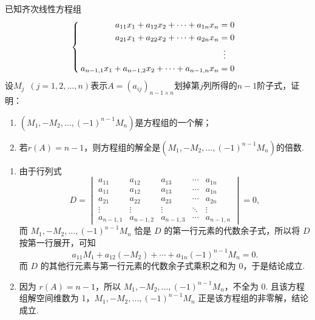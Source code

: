 \begin{exercise}
\begin{exgroup}
        \item 已知齐次线性方程组
        \[\begin{cases} \begin{aligned}
                    a_{11}x_1+a_{12}x_2+\cdots+a_{1n}x_n          & = 0             \\
                    a_{21}x_1+a_{22}x_2+\cdots+a_{2n}x_n          & = 0             \\
                                                                  & \vdotswithin{=} \\
                    a_{n-1,1}x_1+a_{n-1,2}x_2+\cdots+a_{n-1,n}x_n & = 0
                \end{aligned} \end{cases}\]
        设$M_j\enspace(j=1,2,\ldots,n)$表示$A=(a_{ij})_{n-1 \times n}$划掉第$j$列所得的$n-1$阶子式，证明：
        \begin{enumerate}
            \item $(M_1,-M_2,\ldots,(-1)^{n-1}M_n)$是方程组的一个解；

            \item 若$r(A)=n-1$，则方程组的解全是$(M_1,-M_2,\ldots,(-1)^{n-1}M_n)$的倍数.
        \end{enumerate}
        \begin{answer}
            \begin{enumerate}
                \item 由于行列式
                      \[ D = \begin{vmatrix}
                              a_{11}     & a_{12}     & a_{13}     & \cdots & a_{1n}     \\
                              a_{11}     & a_{12}     & a_{13}     & \cdots & a_{1n}     \\
                              a_{21}     & a_{22}     & a_{23}     & \cdots & a_{2n}     \\
                              \vdots     & \vdots     & \vdots     & \ddots & \vdots     \\
                              a_{n-1, 1} & a_{n-1, 2} & a_{n-1, 3} & \cdots & a_{n-1, n}
                          \end{vmatrix} = 0,\]
                      而 $M_1, -M_2, \ldots, (-1)^{n-1}M_n$ 恰是 $D$ 的第一行元素的代数余子式，所以将 $D$ 按第一行展开，可知\[a_{11}M_1+a_{12}(-M_2)+\cdots+a_{1n}(-1)^{n-1}M_n=0.\]
                      而 $D$ 的其他行元素与第一行元素的代数余子式乘积之和为 0，于是结论成立.

                \item 因为 $r(A) = n-1$，所以 $M_1, -M_2, \ldots, (-1)^{n-1}M_n$，不全为 0. 且该方程组解空间维数为 1，$M_1, -M_2, \ldots, (-1)^{n-1}M_n$ 正是该方程组的非零解，结论成立.
            \end{enumerate}
        \end{answer}


\end{exgroup}
\end{exercise}
